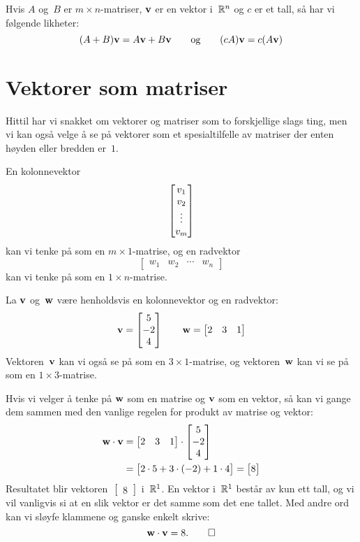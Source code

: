 \begin{thm}
Hvis $A$ og~$B$ er $m \times n$-matriser, $\mathbf{v}$ er en vektor
i~$\mathbb{R}^n$ og $c$ er et tall, så har vi følgende likheter:
\[
(A + B) \mathbf{v} = A \mathbf{v} + B \mathbf{v}
\qquad\text{og}\qquad
(c A) \mathbf{v} = c (A \mathbf{v})
\]
\end{thm}


\section*{Vektorer som matriser}

Hittil har vi snakket om vektorer og matriser som to forskjellige
slags ting, men vi kan også velge å se på vektorer som et
spesialtilfelle av matriser der enten høyden eller bredden er~$1$.

En kolonnevektor
\[
\begin{bmatrix} v_1 \\ v_2 \\ \vdots \\ v_m \end{bmatrix}
\]
kan vi tenke på som en $m \times 1$-matrise, og en radvektor
\[
\begin{bmatrix} w_1 & w_2 & \cdots & w_n \end{bmatrix}
\]
kan vi tenke på som en $1 \times n$-matrise.

\begin{ex}
La $\mathbf{v}$ og~$\mathbf{w}$ være henholdsvis en kolonnevektor og en
radvektor:
\[
\mathbf{v} = \begin{bmatrix} 5 \\ -2 \\ 4 \end{bmatrix}
\qquad
\mathbf{w} = \begin{bmatrix} 2 & 3 & 1 \end{bmatrix}
\]
Vektoren~$\mathbf{v}$ kan vi også se på som en $3 \times 1$-matrise, og
vektoren~$\mathbf{w}$ kan vi se på som en $1 \times 3$-matrise.

Hvis vi velger å tenke på $\mathbf{w}$ som en matrise og $\mathbf{v}$ som en
vektor, så kan vi gange dem sammen med den vanlige regelen for produkt
av matrise og vektor:
\begin{align*}
\mathbf{w} \cdot \mathbf{v}
&= \begin{bmatrix} 2 & 3 & 1 \end{bmatrix} \cdot \begin{bmatrix} 5 \\ -2 \\ 4 \end{bmatrix} \\
&= \begin{bmatrix} 2 \cdot 5 + 3 \cdot (-2) + 1 \cdot 4 \end{bmatrix}
 = \begin{bmatrix} 8 \end{bmatrix}
\end{align*}
Resultatet blir vektoren~$\begin{bmatrix} 8 \end{bmatrix}$ i~$\mathbb{R}^1$.
En vektor i~$\mathbb{R}^1$ består av kun ett tall, og vi vil vanligvis si at
en slik vektor er det samme som det ene tallet.  Med andre ord kan vi
sløyfe klammene og ganske enkelt skrive:
\[
\mathbf{w} \cdot \mathbf{v} = 8.\qedhere
\]
\end{ex}


